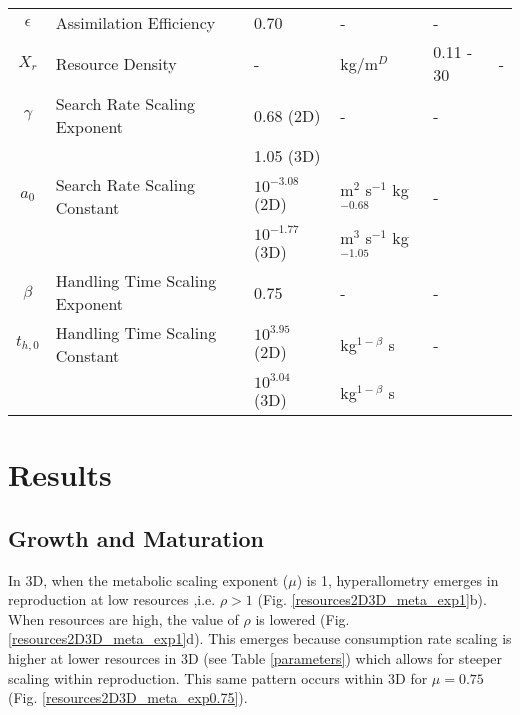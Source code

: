 \documentclass[a4paper, 11pt, hidelinks]{article} %
\begin{document}
\begin{centering}
\begin{table}[h!]
{\begin{tabular}{c p{3.9cm} l l l p{3cm}}
				$\epsilon$	& Assimilation Efficiency & 0.70 & - & - 		& \cite{Peters1983} \\
				$X_r$ 		& Resource Density		& -		& kg/m$^D$		& 0.11 - 30				& -\\
				$\gamma$	& Search Rate Scaling Exponent & 0.68 (2D)	& - & - & \cite{Pawar2012} \\
				&						& 1.05 (3D)\\
				$a_0$		& Search Rate Scaling Constant & $10^{-3.08}$ (2D) & m$^2$ s$^{-1}$ kg$^{-0.68}$   & - &\cite{Pawar2012}	\\
				&						& $10^{-1.77}$ (3D)& m$^3$ s$^{-1}$ kg$^{-1.05} $\\
				$\beta$		& Handling Time Scaling Exponent& 0.75 & - & - & \cite{Pawar2012}\\
				$t_{h, 0}$	& Handling Time Scaling Constant& $10^{3.95}$ (2D) &kg$^{1-\beta}$ s& -& \cite{Pawar2012}	\\
				&						& $10^{3.04}$ (3D)			&kg$^{1-\beta}$ s\\
				\hline
			\end{tabular}
		}%
		\end{table}
	\end{centering}

	\newpage

\section{Results}
	

	\subsection{Growth and Maturation}
	In 3D, when the metabolic scaling exponent ($ \mu $) is 1, hyperallometry emerges in reproduction at low resources ,i.e. $ \rho > 1 $ (Fig. \ref{resources2D3D_meta_exp1}b).  When resources are high, the value of $ \rho $ is lowered (Fig. \ref{resources2D3D_meta_exp1}d).  This emerges because consumption rate scaling is higher at lower resources in 3D (see Table \ref{parameters}) which allows for steeper scaling within reproduction.  This same pattern occurs within 3D for $ \mu = 0.75$ (Fig. \ref{resources2D3D_meta_exp0.75}).  
	
\end{document}
